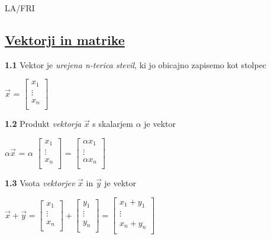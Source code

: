 \documentclass{article}
\begin{document}
\begin{center}
	{\small LA/FRI \par}
\end{center}

\begin{multicols}{2}

\section{\underline{Vektorji in matrike}}

\textbf{1.1} Vektor je \textit{urejena n-terica stevil}, ki jo obicajno
zapisemo kot stolpec\smallskip
\begin{center}
	$\vec{x}$ =
	$\begin{bmatrix}
			x_{1}  \\
			\vdots \\
			x_{n}  \\
		\end{bmatrix}$
\end{center}

\textbf{1.2} Produkt \textit{vektorja} $\vec{x}$ s skalarjem $\alpha$ je vektor
\begin{center}
	$\alpha \vec{x}$ =
	$\alpha$
	$\begin{bmatrix}
			x_{1}  \\
			\vdots \\
			x_{n}  \\
		\end{bmatrix}$ =
	$\begin{bmatrix}
			\alpha x_{1} \\
			\vdots       \\
			\alpha x_{n} \\
		\end{bmatrix}$
\end{center}

\textbf{1.3} Vsota \textit{vektorjev} $\vec{x}$ in $\vec{y}$ je vektor
\begin{center}
	$\vec{x} + \vec{y} =
		\begin{bmatrix}
			x_{1}  \\
			\vdots \\
			x_{n}  \\
		\end{bmatrix} +
		\begin{bmatrix}
			y_{1}  \\
			\vdots \\
			y_{n}  \\
		\end{bmatrix} =
		\begin{bmatrix}
			x_{1}  +  y_{1} \\
			\vdots          \\
			x_{n} + y_{n}   \\
		\end{bmatrix}
	$
\end{center}


\end{multicols}
\end{document}
